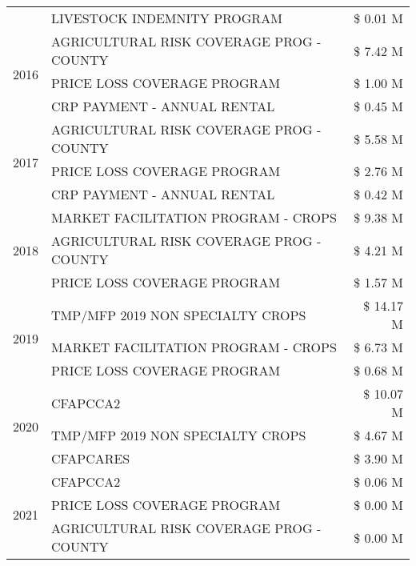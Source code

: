 \begin{tabular}{llr}
 & LIVESTOCK INDEMNITY PROGRAM & \$ 0.01 M \\
\cline{1-3}
\multirow[t]{3}{*}{2016} & AGRICULTURAL RISK COVERAGE PROG - COUNTY      & \$ 7.42 M \\
 & PRICE LOSS COVERAGE PROGRAM                   & \$ 1.00 M \\
 & CRP PAYMENT - ANNUAL RENTAL                   & \$ 0.45 M \\
\cline{1-3}
\multirow[t]{3}{*}{2017} & AGRICULTURAL RISK COVERAGE PROG - COUNTY & \$ 5.58 M \\
 & PRICE LOSS COVERAGE PROGRAM & \$ 2.76 M \\
 & CRP PAYMENT - ANNUAL RENTAL & \$ 0.42 M \\
\cline{1-3}
\multirow[t]{3}{*}{2018} & MARKET FACILITATION PROGRAM - CROPS & \$ 9.38 M \\
 & AGRICULTURAL RISK COVERAGE PROG - COUNTY & \$ 4.21 M \\
 & PRICE LOSS COVERAGE PROGRAM & \$ 1.57 M \\
\cline{1-3}
\multirow[t]{3}{*}{2019} & TMP/MFP 2019 NON SPECIALTY CROPS & \$ 14.17 M \\
 & MARKET FACILITATION PROGRAM - CROPS & \$ 6.73 M \\
 & PRICE LOSS COVERAGE PROGRAM & \$ 0.68 M \\
\cline{1-3}
\multirow[t]{3}{*}{2020} & CFAPCCA2 & \$ 10.07 M \\
 & TMP/MFP 2019 NON SPECIALTY CROPS & \$ 4.67 M \\
 & CFAPCARES & \$ 3.90 M \\
\cline{1-3}
\multirow[t]{3}{*}{2021} & CFAPCCA2 & \$ 0.06 M \\
 & PRICE LOSS COVERAGE PROGRAM & \$ 0.00 M \\
 & AGRICULTURAL RISK COVERAGE PROG - COUNTY & \$ 0.00 M \\
\cline{1-3}
\bottomrule
\end{tabular}
